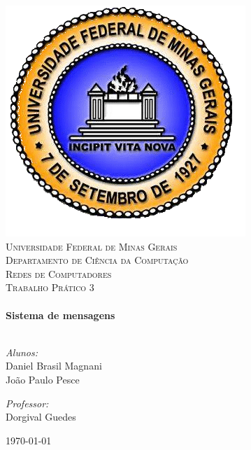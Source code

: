 \begin{titlepage}
\begin{center}

\includegraphics[scale=0.2]{imagens/UFMG.png}\\
\textsc{\LARGE Universidade Federal de Minas Gerais\\
	Departamento de Ciência da Computação}\\[1.5cm]

\textsc{\Large Redes de Computadores\\
	Trabalho Prático 3}\\[0.5cm]

\hrulefill \\[0.4cm]
{ \LARGE \bfseries Sistema de mensagens}\\[0.4cm]

\hrulefill \\[1.5cm]
\vspace{7cm}
\begin{minipage}{0.4\textwidth}
\begin{flushleft} \large
\emph{Alunos:}\\
Daniel Brasil Magnani\\
João Paulo Pesce \\
\end{flushleft}
\end{minipage}
\begin{minipage}{0.4\textwidth}
\begin{flushright} \large
\emph{Professor:}\\
Dorgival Guedes\\
\end{flushright}
\end{minipage}

\vfill

{\large \today}

\end{center}
\end{titlepage}
